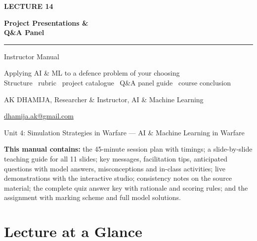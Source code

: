 \documentclass[11pt]{article}
\begin{document}
\begin{titlepage}\centering\vspace*{2.2cm}
{\color{AccN}\large\bfseries LECTURE 14\par}\vspace{0.6cm}
{\color{NavyN}\Huge\bfseries Project Presentations \&\\Q\&A Panel\par}\vspace{0.6cm}
{\color{AccN}\rule{0.7\textwidth}{1.5pt}}\par\vspace{0.6cm}
{\LARGE Instructor Manual\par}\vspace{0.4cm}
{\large\begin{minipage}{0.85\textwidth}\centering Applying AI \& ML to a defence problem of your choosing\\Structure \textbullet\ rubric \textbullet\ project catalogue \textbullet\ Q\&A panel guide \textbullet\ course conclusion\end{minipage}\par}\vspace{2cm}
{\large AK DHAMIJA, Researcher \& Instructor, AI \& Machine Learning\par}\vspace{0.2cm}
{\normalsize \href{mailto:dhamija.ak@gmail.com}{dhamija.ak@gmail.com} \quad\textbullet{}\par}\vspace{0.3cm}
{Unit 4: Simulation Strategies in Warfare --- AI \& Machine Learning in Warfare\par}\vfill
\begin{tcolorbox}[colback=NavyN!4,colframe=NavyN,boxrule=0.6pt,arc=2pt,width=0.9\textwidth]\small
\textbf{This manual contains:} the 45-minute session plan with timings; a slide-by-slide teaching guide for all 11 slides; key messages, facilitation tips, anticipated questions with model answers, misconceptions and in-class activities; live demonstrations with the interactive studio; consistency notes on the source material; the complete quiz answer key with rationale and scoring rules; and the assignment with marking scheme and full model solutions.
\end{tcolorbox}
\end{titlepage}
\tableofcontents\newpage


\section{Lecture at a Glance}
\end{document}

